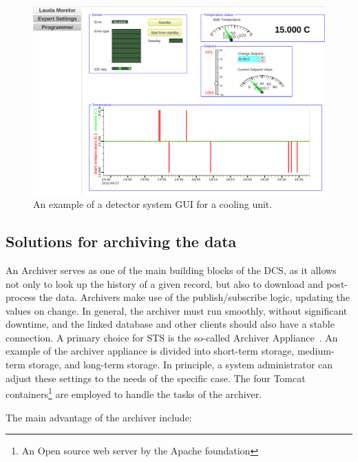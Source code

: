 \begin{figure}[!h]
\centering
\includegraphics[width=1\columnwidth]{Chapter4/images/lauda1.png}
\caption{An example of a detector system \gls{GUI} for a cooling unit.}
\label{fig_lauda1}
\end{figure}

\newpage
\subsection{Solutions for archiving the data} \label{archiver}
An Archiver serves as one of the main building blocks of the \gls{DCS}, as it allows not only to look up the history of a given record, but also to download and post-process the data. Archivers make use of the publish/subscribe logic, updating the values on change. In general, the archiver must run smoothly, without significant downtime, and the linked database and other clients should also have a stable connection. A primary choice for \gls{STS} is the so-called Archiver Appliance~\cite{archiver_appliance}. An example of the archiver appliance is divided into short-term storage, medium-term storage, and long-term storage. In principle, a system administrator can adjust these settings to the needs of the specific case. The  four Tomcat containers\footnote{An Open source web server by the Apache foundation} are employed to handle the tasks of the archiver.  

The main advantage of the archiver include: 

